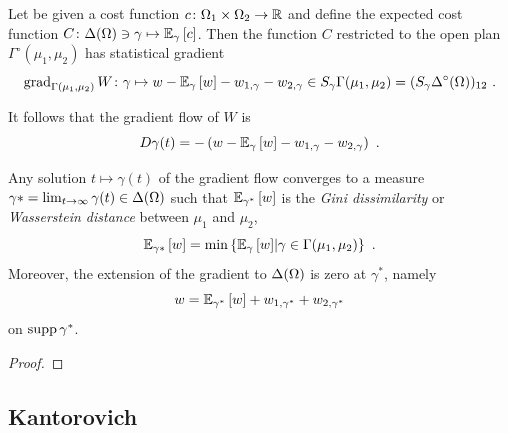 \documentclass[12pt,a4paper]{amsart}
\begin{document}
\begin{proposition}Let be given a cost function $c \colon \Omega_1 \times \Omega_2 \to \mathbb R$ and define the expected cost function $C \colon \Delta(\Omega) \ni \gamma \mapsto {\operatorname{\mathbb E}}_{\gamma}\left[c\right]$. Then the function $C$ restricted to the open plan $\Gamma^\circ(\mu_1,\mu_2)$ has statistical gradient
%
\begin{equation*}
 \operatorname{grad}_{\Gamma(\mu_1,\mu_2)} W \colon \gamma \mapsto w - {\operatorname{\mathbb E}}_{\gamma}\left[w\right] - w_{1,\gamma} - w_{2,\gamma} \in S_\gamma\Gamma(\mu_1,\mu_2) = (S_\gamma \Delta^\circ(\Omega))_{12} \ . 
\end{equation*}

It follows that the gradient flow of $W$ is
%
\begin{equation*}
  D\gamma(t) = - \left(w - {\operatorname{\mathbb E}}_{\gamma}\left[w\right] - w_{1,\gamma} - w_{2,\gamma}\right) \ .
\end{equation*}

Any solution $t \mapsto \gamma(t)$ of the gradient flow converges to a measure $\gamma* = \lim_{t \to \infty} \gamma(t) \in \Delta(\Omega)$ such that ${\operatorname{\mathbb E}}_{\gamma^*}\left[w\right]$ is the \emph{Gini dissimilarity} or \emph{Wasserstein distance} between $\mu_1$ and $\mu_2$,
%
\begin{equation*}
  {\operatorname{\mathbb E}}_{\gamma*}\left[w\right] = \min \left\{ {\operatorname{\mathbb E}}_{\gamma}\left[w\right] \middle|  \gamma \in \Gamma(\mu_1,\mu_2) \right\} \ .
\end{equation*}
%
 Moreover, the extension of the gradient to $\Delta(\Omega)$ is zero at $\gamma^*$, namely
%
\begin{equation*}
  w = {\operatorname{\mathbb E}}_{\gamma^*}\left[w\right] + w_{1,\gamma^*} + w_{2,\gamma^*}
\end{equation*}
%
on $\operatorname{supp}{\gamma^*}$.
\end{proposition}

\begin{proof}
  
\end{proof}

\subsection{Kantorovich}


\end{document}
